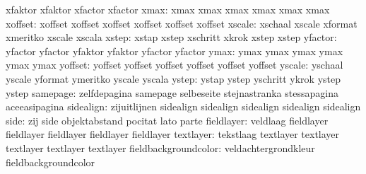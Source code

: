                            xfaktor                   xfaktor
                           xfactor                   xfactor %
                     xmax: xmax                      xmax
                           xmax                      xmax
                           xmax                      xmax %
                  xoffset: xoffset                   xoffset
                           xoffset                   xoffset
                           xoffset                   xoffset %
                   xscale: xschaal                   xscale
                           xformat                   xmeritko
                           xscale                    xscala %
                    xstep: xstap                     xstep
                           xschritt                  xkrok
                           xstep                     xstep %
                  yfactor: yfactor                   yfactor
                           yfaktor                   yfaktor
                           yfactor                   yfactor %
                     ymax: ymax                      ymax
                           ymax                      ymax
                           ymax                      ymax %
                  yoffset: yoffset                   yoffset
                           yoffset                   yoffset
                           yoffset                   yoffset %
                   yscale: yschaal                   yscale
                           yformat                   ymeritko
                           yscale                    yscala %
                    ystep: ystap                     ystep
                           yschritt                  ykrok
                           ystep                     ystep %
                 samepage: zelfdepagina              samepage
                           selbeseite                stejnastranka
                           stessapagina              aceeasipagina
   sidealign: zijuitlijnen sidealign
              sidealign    sidealign
              sidealign    sidealign
                     side: zij                       side
                           objektabstand             pocitat
                           lato                      parte
 fieldlayer: veldlaag                  fieldlayer
             fieldlayer                fieldlayer
             fieldlayer                fieldlayer
textlayer: tekstlaag                 textlayer
           textlayer                 textlayer
           textlayer                 textlayer
     fieldbackgroundcolor: veldachtergrondkleur      fieldbackgroundcolor
